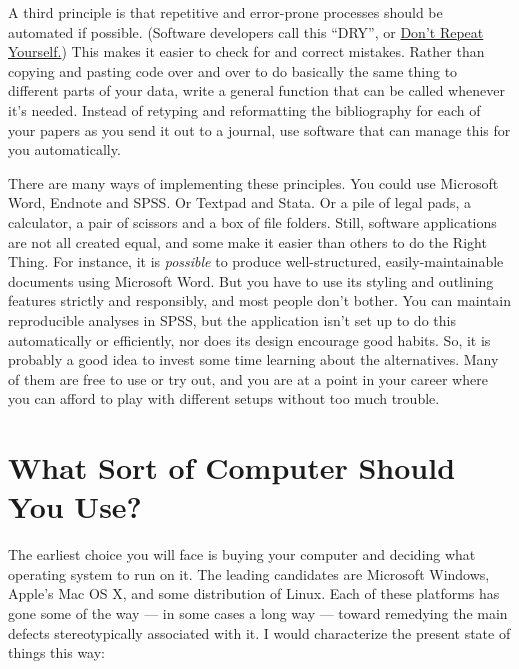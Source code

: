 \documentclass[11pt,article,oneside]{memoir}
\begin{document}
A third principle is that repetitive and error-prone processes should
be automated if possible. (Software developers call this ``DRY'', or
\href{http://en.wikipedia.org/wiki/Don't_repeat_yourself}{Don't Repeat
  Yourself.}) This makes it easier to check for and correct
mistakes. Rather than copying and pasting code over and over to do
basically the same thing to different parts of your data, write a
general function that can be called whenever it's needed. Instead of
retyping and reformatting the bibliography for each of your papers as
you send it out to a journal, use software that can manage this for
you automatically.

There are many ways of implementing these principles. You could use
Microsoft Word, Endnote and SPSS. Or Textpad and Stata. Or a pile of
legal pads, a calculator, a pair of scissors and a box of file
folders. Still, software applications are not all created equal, and
some make it easier than others to do the Right Thing. For instance,
it is \emph{possible} to produce well-structured, easily-maintainable
documents using Microsoft Word. But you have to use its styling and
outlining features strictly and responsibly, and most people don't
bother. You can maintain reproducible analyses in SPSS, but the
application isn't set up to do this automatically or efficiently, nor
does its design encourage good habits. So, it is probably a good idea
to invest some time learning about the alternatives. Many of them are
free to use or try out, and you are at a point in your career where
you can afford to play with different setups without too much trouble.

\section*{What Sort of Computer Should You Use?}
\label{sec-3}
The earliest choice you will face is buying your computer and deciding
what operating system to run on it. The leading candidates are
Microsoft Windows, Apple's Mac OS X, and some distribution of
Linux. Each of these platforms has gone some of the way --- in some
cases a long way --- toward remedying the main defects stereotypically
associated with it. I would characterize the present state of things
this way:
\end{document}
